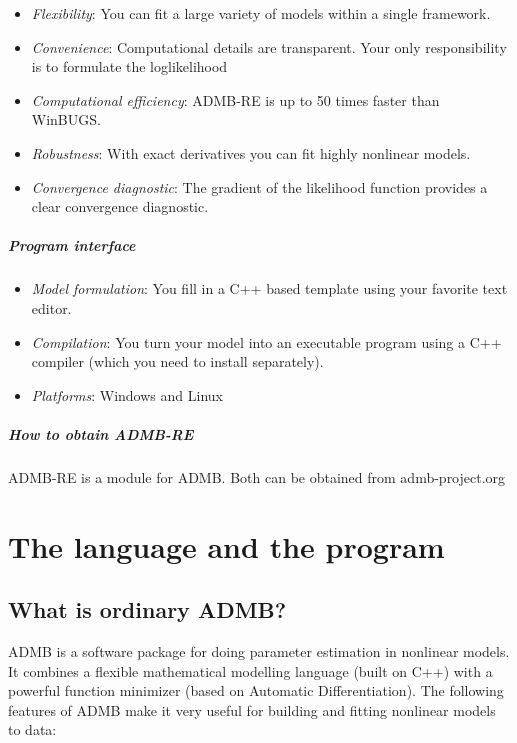 \documentclass[12pt,letter,reqno]{book}
\begin{document}
\begin{itemize}
\item \textit{Flexibility}: You can fit a large variety of models within a single framework.
\item \textit{Convenience}: Computational details are transparent. Your only
responsibility is to formulate the loglikelihood
\item \textit{Computational efficiency}: ADMB-RE is up to 50 times faster
than WinBUGS.
\item \textit{Robustness}: With exact derivatives you can fit highly nonlinear models.
\item \textit{Convergence diagnostic}: The gradient of the likelihood
function provides a clear convergence diagnostic.
\end{itemize}

\paragraph{Program interface}

\begin{itemize}
\item\textit{Model formulation}: You fill in a C++ based template
using your favorite text editor.

\item \textit{Compilation}: You turn your model into an executable program using
a  C++ compiler (which you need to install separately).

\item\textit{Platforms}: Windows and Linux
\end{itemize}

\paragraph{How to obtain ADMB-RE}

ADMB-RE is a module for ADMB. Both can be obtained from
admb-project.org

\chapter{The language and the program}

\section{What is ordinary ADMB?}

ADMB is a software package for doing parameter estimation in nonlinear
models. It combines a flexible mathematical modelling language (built on
C++) with a powerful function minimizer (based on Automatic
Differentiation). The following features of ADMB make it very useful for
building and fitting nonlinear models to data:
\end{document}
